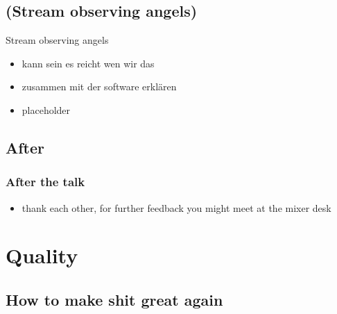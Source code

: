 \documentclass[hyperref={pdfpagelabels=false}]{beamer}
\begin{document}
\subsection{(Stream observing angels)} %
\begin{frame}{Stream observing angels}
\begin{itemize}
\item  kann sein es reicht wen wir das
\item  zusammen mit der software erklären
\item  placeholder
\end{itemize} 
\end{frame}

\subsection{After} %
\begin{frame}
\frametitle{After the talk}
\begin{itemize}
\item thank each other, for further feedback you might meet at the mixer desk
\end{itemize} 
\end{frame}

\section{Quality} 
\subsection{How to make shit great again} 
\begin{frame}
\end{frame}
\end{document}
